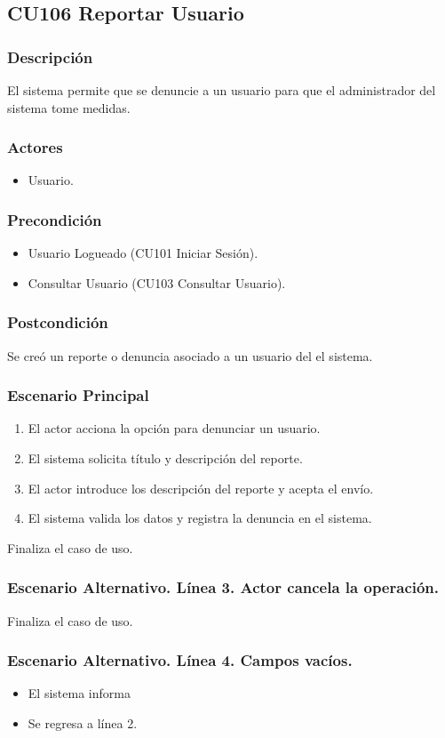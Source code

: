 \subsection{CU106 Reportar Usuario}
\subsubsection{Descripci\'{o}n}
El sistema permite que se denuncie a un usuario para que el administrador del sistema tome medidas.
\subsubsection{Actores}
\begin{itemize}
\item Usuario.
\end{itemize}
\subsubsection{Precondici\'{o}n}
\begin{itemize}
\item Usuario Logueado (CU101 Iniciar Sesi\'{o}n).
\item Consultar Usuario (CU103 Consultar Usuario).
\end{itemize}
\subsubsection{Postcondici\'{o}n}
Se cre\'{o} un reporte o denuncia asociado a un usuario del el sistema.
\subsubsection{Escenario Principal}
\begin{enumerate}
\item El actor acciona la opci\'{o}n para denunciar un usuario.
\item El sistema solicita t\'{i}tulo y descripci\'{o}n del reporte.
\item El actor introduce los descripci\'{o}n del reporte y acepta el env\'{i}o.
\item El sistema valida los datos y registra la denuncia en el sistema.
\end{enumerate}
Finaliza el caso de uso.
\subsubsection{Escenario Alternativo. L\'{i}nea 3. Actor cancela la operaci\'{o}n.}
Finaliza el caso de uso.
\subsubsection{Escenario Alternativo. L\'{i}nea 4. Campos vac\'{i}os.}
\begin{itemize}
\setcounter{enumi}{4}
\item El sistema informa
\item Se regresa a l\'{i}nea 2.
\end{itemize}
